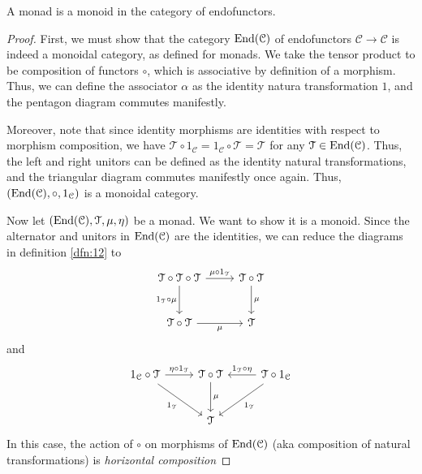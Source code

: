 \begin{theorem}\label{thm:3}
	A monad is a monoid in the category of endofunctors.
\end{theorem}
\begin{proof}
	First, we must show that the category $\operatorname{End}(\mathcal{C} ) $ of endofunctors $\mathcal{C} \to \mathcal{C} $ is indeed a monoidal category, as defined for monads. We take the tensor product to be composition of functors $\circ $, which is associative by definition of a morphism. Thus, we can define the associator $\alpha $ as the identity natura transformation $1$, and the pentagon diagram commutes manifestly.

	Moreover, note that since identity morphisms are identities with respect to morphism composition, we have $\mathcal{T} \circ 1_{\mathcal{C} } =1_{\mathcal{C} } \circ \mathcal{T} =\mathcal{T} $ for any $\mathcal{T} \in \operatorname{End}(\mathcal{C} ) $. Thus, the left and right unitors can be defined as the identity natural transformations, and the triangular diagram commutes manifestly once again. Thus, $(\operatorname{End}(\mathcal{C} ) ,\circ ,1_\mathcal{C} )$ is a monoidal category.

	Now let $(\operatorname{End}(\mathcal{C} ) ,\mathcal{T} ,\mu ,\eta )$ be a monad. We want to show it is a monoid. Since the alternator and unitors in $\operatorname{End}(\mathcal{C} ) $ are the identities, we can reduce the diagrams in definition \ref{dfn:12} to
	\[\begin{tikzcd}[row sep = 2.5em, column sep = 2.5em]
	\mathcal{T} \circ \mathcal{T} \circ \mathcal{T}\ar[" \mu \circ 1_{\mathcal{T} } ", r] \ar[" 1_{\mathcal{T} }\circ \mu  "', d]  & \mathcal{T} \circ \mathcal{T} \ar[" \mu  ", d]  \\
	\mathcal{T} \circ \mathcal{T} \ar[" \mu  "', r]  & \mathcal{T} 
	\end{tikzcd}\]
	and
	\[\begin{tikzcd}[row sep = 2.5em, column sep = 2.5em]
	1_{\mathcal{C} } \circ \mathcal{T} \ar[" \eta \circ 1_{\mathcal{T} } ", r] \ar[" 1_{\mathcal{T} }  "', dr]  & \mathcal{T} \circ \mathcal{T} \ar[" \mu  ", d]  & \mathcal{T} \circ 1_{\mathcal{C} } \ar[" 1_{\mathcal{T} }\circ \eta  "', l] \ar[" 1_{\mathcal{T} }  ", dl] \\
	 & \mathcal{T}  & 
	\end{tikzcd}\]
	In this case, the action of $\circ $ on morphisms of $\operatorname{End}(\mathcal{C} ) $ (aka composition of natural transformations) is \emph{horizontal composition}
\end{proof}
